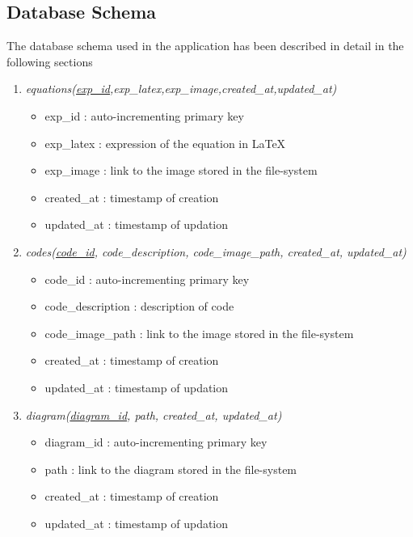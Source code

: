 \documentclass[a4paper,12pt,oneside]{book}
\begin{document}
    \subsection{Database Schema}
        The database schema used in the application has been described in detail in the following sections
        
        \begin{enumerate}
            \item \textit{equations(\underline{exp\_id},exp\_latex,exp\_image,created\_at,updated\_at)}
                \begin{itemize}
                  \item exp\_id : auto-incrementing primary key
                  \item exp\_latex : expression of the equation in \LaTeX
                  \item exp\_image : link to the image stored in the file-system
                  \item created\_at : timestamp of creation
                  \item updated\_at : timestamp of updation 
                \end{itemize}
            
            \item \textit{codes(\underline{code\_id}, code\_description, code\_image\_path, created\_at, updated\_at)}
                \begin{itemize}
                  \item code\_id : auto-incrementing primary key
                  \item code\_description : description of code
                  \item code\_image\_path : link to the image stored in the file-system
                  \item created\_at : timestamp of creation
                  \item updated\_at : timestamp of updation 
                \end{itemize}
                
            \item \textit{diagram(\underline{diagram\_id}, path, created\_at, updated\_at)}
                \begin{itemize}
                  \item diagram\_id : auto-incrementing primary key
                  \item path : link to the diagram stored in the file-system
                  \item created\_at : timestamp of creation
                  \item updated\_at : timestamp of updation 
                \end{itemize}
                

\end{enumerate}
\end{document}
